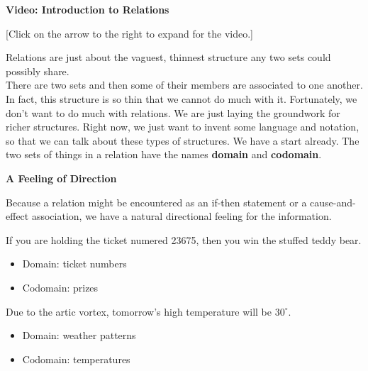 \documentclass{ximera}
\begin{document}
\begin{explanation} \textbf{Video: Introduction to Relations}

[Click on the arrow to the right to expand for the video.]
\begin{expandable} 

\begin{center}
\end{center}

\end{expandable}
\end{explanation}





Relations are just about the vaguest, thinnest structure any two sets could possibly share. \\


There are two sets and then some of their members are associated to one another. In fact, this structure is so thin that we cannot do much with it.  Fortunately, we don't want to do much with relations.  We are just laying the groundwork for richer structures.  Right now, we just want to invent some language and notation, so that we can talk about these types of structures. We have a start already. The two sets of things in a relation have the names \textbf{\textcolor{purple!85!blue}{domain}} and \textbf{\textcolor{purple!85!blue}{codomain}}.




\textbf{\textcolor{red!80!black}{A Feeling of Direction}}



Because a relation might be encountered as an if-then statement or a cause-and-effect association, we have a natural directional feeling for the information.  



\begin{idea}
If you are holding the ticket numered 23675, then you win the stuffed teddy bear. \\

\begin{itemize}
    \item Domain: ticket numbers
    \item Codomain: prizes
\end{itemize}

\end{idea}



\begin{idea}
Due to the artic vortex, tomorrow's high temperature will be $30^{\circ}$. \\

\begin{itemize}
    \item Domain: weather patterns
    \item Codomain: temperatures
\end{itemize}

\end{idea}
\end{document}
